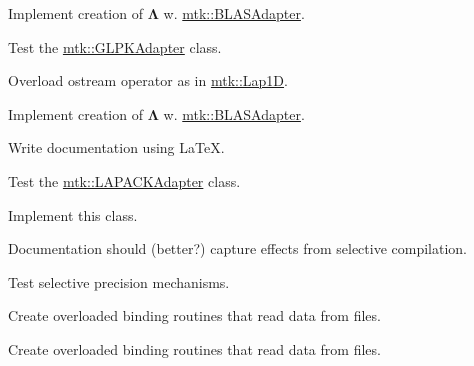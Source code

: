\begin{DoxyRefList}
Implement creation of $ \mathbf{\Lambda}$ w. \hyperlink{classmtk_1_1BLASAdapter}{mtk\+::\+B\+L\+A\+S\+Adapter}.  
\item[\label{todo__todo000027}%
\hypertarget{todo__todo000027}{}%
File \hyperlink{mtk__glpk__adapter__test_8cc}{mtk\+\_\+glpk\+\_\+adapter\+\_\+test.cc} ]Test the \hyperlink{classmtk_1_1GLPKAdapter}{mtk\+::\+G\+L\+P\+K\+Adapter} class.  
\item[\label{todo__todo000017}%
\hypertarget{todo__todo000017}{}%
File \hyperlink{mtk__grad__1d_8cc}{mtk\+\_\+grad\+\_\+1d.cc} ]Overload ostream operator as in \hyperlink{classmtk_1_1Lap1D}{mtk\+::\+Lap1\+D}.

Implement creation of $ \mathbf{\Lambda}$ w. \hyperlink{classmtk_1_1BLASAdapter}{mtk\+::\+B\+L\+A\+S\+Adapter}.  
\item[\label{todo__todo000019}%
\hypertarget{todo__todo000019}{}%
File \hyperlink{mtk__lapack__adapter_8cc}{mtk\+\_\+lapack\+\_\+adapter.cc} ]Write documentation using La\+Te\+X. 
\item[\label{todo__todo000028}%
\hypertarget{todo__todo000028}{}%
File \hyperlink{mtk__lapack__adapter__test_8cc}{mtk\+\_\+lapack\+\_\+adapter\+\_\+test.cc} ]Test the \hyperlink{classmtk_1_1LAPACKAdapter}{mtk\+::\+L\+A\+P\+A\+C\+K\+Adapter} class.  
\item[\label{todo__todo000003}%
\hypertarget{todo__todo000003}{}%
File \hyperlink{mtk__quad__1d_8h}{mtk\+\_\+quad\+\_\+1d.h} ]Implement this class.  
\item[\label{todo__todo000004}%
\hypertarget{todo__todo000004}{}%
File \hyperlink{mtk__roots_8h}{mtk\+\_\+roots.h} ]Documentation should (better?) capture effects from selective compilation.

Test selective precision mechanisms.  
\item[\label{todo__todo000006}%
\hypertarget{todo__todo000006}{}%
File \hyperlink{mtk__uni__stg__grid__1d_8h}{mtk\+\_\+uni\+\_\+stg\+\_\+grid\+\_\+1d.h} ]Create overloaded binding routines that read data from files.  
\item[\label{todo__todo000009}%
\hypertarget{todo__todo000009}{}%
File \hyperlink{mtk__uni__stg__grid__2d_8h}{mtk\+\_\+uni\+\_\+stg\+\_\+grid\+\_\+2d.h} ]Create overloaded binding routines that read data from files. 
\end{DoxyRefList}